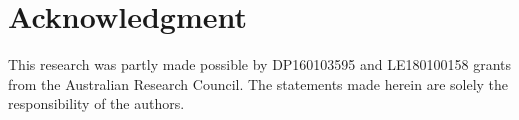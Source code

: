 \documentclass[conference]{IEEEtran}
\begin{document}
\section*{Acknowledgment}
This research was partly made possible by DP160103595 and LE180100158 grants from the Australian Research Council. The statements made herein are solely the responsibility of the authors.

  
 
\end{document}
